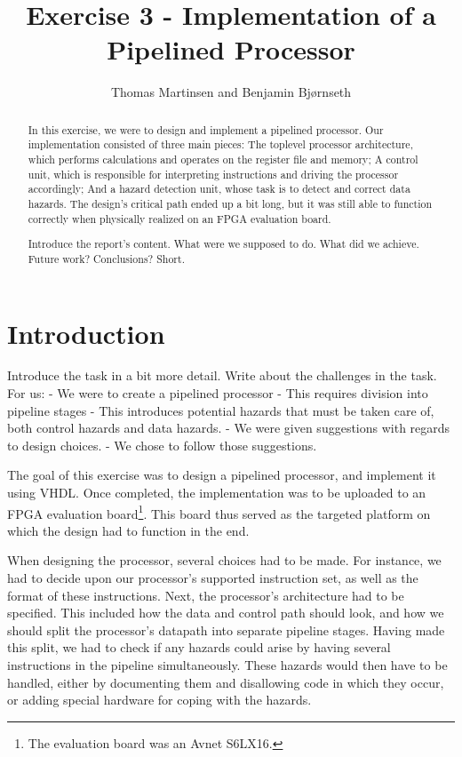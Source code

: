 \documentclass[11pt]{article}
\title{Exercise 3 - Implementation of a Pipelined Processor}
\author{Thomas Martinsen and Benjamin Bj\o rnseth}
\begin{document}
\maketitle

\begin{abstract}
  In this exercise, we were to design and implement a pipelined
  processor. Our implementation consisted of three main pieces: The
  toplevel processor architecture, which performs calculations and
  operates on the register file and memory; A control unit, which is
  responsible for interpreting instructions and driving the processor
  accordingly; And a hazard detection unit, whose task is to detect
  and correct data hazards. The design's critical path ended up a bit
  long, but it was still able to function correctly when physically
  realized on an FPGA evaluation board.

  Introduce the report's content. What were we supposed to do. What
  did we achieve. Future work? Conclusions? Short.
\end{abstract}

\section{Introduction}
\label{sec:introduction}
Introduce the task in a bit more detail. Write about the challenges in
the task. For us:
 - We were to create a pipelined processor
 - This requires division into pipeline stages 
 - This introduces potential hazards that must be taken care of, both control hazards and data
hazards.  
- We were given suggestions with regards to design choices.
- We chose to follow those suggestions.

The goal of this exercise was to design a pipelined processor, and
implement it using VHDL. Once completed, the implementation was to be
uploaded to an FPGA evaluation board\footnote{The evaluation board was
  an Avnet S6LX16.}. This board thus served as the targeted platform
on which the design had to function in the end. 

When designing the processor, several choices had to be made. For
instance, we had to decide upon our processor's supported instruction
set, as well as the format of these instructions. Next, the
processor's architecture had to be specified. This included how the
data and control path should look, and how we should split the
processor's datapath into separate pipeline stages. Having made this
split, we had to check if any hazards could arise by having several
instructions in the pipeline simultaneously. These hazards would then
have to be handled, either by documenting them and disallowing code in
which they occur, or adding special hardware for coping with the
hazards.
\end{document}
